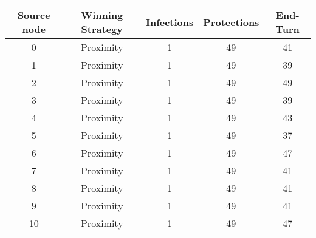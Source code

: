 \documentclass[results.tex]{subfiles}
\begin{document}
    \begin{center}
        \begin{tabular}{| c || c | c | c | c |}
            \hline
            {\bfseries Source node} & {\bfseries Winning Strategy} & {\bfseries Infections} & {\bfseries Protections}
            & {\bfseries End-Turn}
            \\  %
            \hline\hline
            0                       & Proximity                    & 1                      & 49                      & 41                   \\
            \hline
            1                       & Proximity                    & 1                      & 49                      & 39                   \\
            \hline
            2                       & Proximity                    & 1                      & 49                      & 49                   \\
            \hline
            3                       & Proximity                    & 1                      & 49                      & 39                   \\
            \hline
            4                       & Proximity                    & 1                      & 49                      & 43                   \\
            \hline
            5                       & Proximity                    & 1                      & 49                      & 37                   \\
            \hline
            6                       & Proximity                    & 1                      & 49                      & 47                   \\
            \hline
            7                       & Proximity                    & 1                      & 49                      & 41                   \\
            \hline
            8                       & Proximity                    & 1                      & 49                      & 41                   \\
            \hline
            9                       & Proximity                    & 1                      & 49                      & 41                   \\
            \hline
            10                      & Proximity                    & 1                      & 49                      & 47                   \\

\end{tabular}
\end{center}
\end{document}
